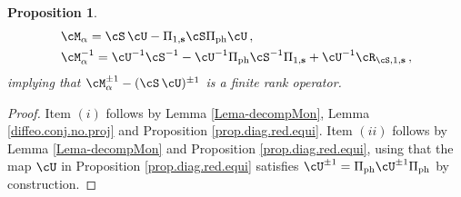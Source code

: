 \documentclass[a4paper,reqno,10pt]{article}
\newtheorem{pro}{Proposition}[section]
\newcommand{\pa}{\partial}
\begin{document}
\begin{pro}
\begin{align}
       & \cM_{\alpha}= \cS \,\cU - \Pi_{1,{\bf s}}  \cS \Pi_{\rm ph} \cU \,, \\
       & \cM_{\alpha}^{-1} = \cU^{-1} \cS^{-1} - \cU^{-1} \Pi_{\rm ph} \cS^{-1} \Pi_{1,{\bf s}}  + \cU^{-1} \cR_{\cS,1,{\bf s}} \,,
    \end{align}
    implying that  $\cM_{\alpha}^{\pm 1} - (\cS\,\cU)^{\pm 1}$ is a finite rank operator.
\end{pro}
\begin{proof}
    Item $(i)$ follows by Lemma \ref{Lema-decompMon}, Lemma \ref{diffeo.conj.no.proj} and Proposition \ref{prop.diag.red.equi}. Item $(ii)$ follows by Lemma \ref{Lema-decompMon} and Proposition \ref{prop.diag.red.equi}, using that the map $\cU$ in Proposition \ref{prop.diag.red.equi} satisfies $\cU^{\pm 1}= \Pi_{\rm ph}\cU^{\pm 1}\Pi_{\rm ph}$ by construction.
\end{proof}
\end{document}
